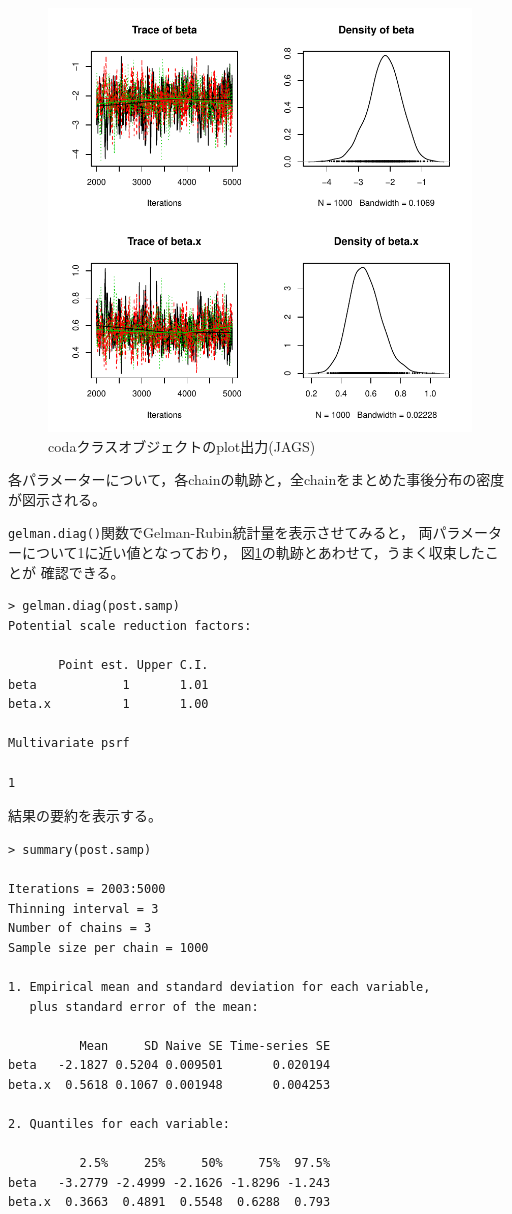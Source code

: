 \documentclass[11pt,uplatex]{jsarticle}
\begin{document}
\begin{figure}[htbp]
	\begin{center}
		\includegraphics[bb=0 0 400 400, clip, width=300 bp]{example2_jags_results.pdf}
	\end{center}
	\caption{\textsf{coda}クラスオブジェクトのplot出力(JAGS)}
	\label{plot_coda}
\end{figure}
\noindent
各パラメーターについて，各chainの軌跡と，全chainをまとめた事後分布の密度が図示される。

\texttt{gelman.diag()}関数でGelman-Rubin統計量を表示させてみると，
両パラメーターについて1に近い値となっており，
図\ref{plot_coda}の軌跡とあわせて，うまく収束したことが
確認できる。
\begin{lstlisting}
> gelman.diag(post.samp)
Potential scale reduction factors:

       Point est. Upper C.I.
beta            1       1.01
beta.x          1       1.00

Multivariate psrf

1
\end{lstlisting}

\vspace{2zw}

結果の要約を表示する。
\begin{lstlisting}
> summary(post.samp)

Iterations = 2003:5000
Thinning interval = 3 
Number of chains = 3 
Sample size per chain = 1000 

1. Empirical mean and standard deviation for each variable,
   plus standard error of the mean:

          Mean     SD Naive SE Time-series SE
beta   -2.1827 0.5204 0.009501       0.020194
beta.x  0.5618 0.1067 0.001948       0.004253

2. Quantiles for each variable:

          2.5%     25%     50%     75%  97.5%
beta   -3.2779 -2.4999 -2.1626 -1.8296 -1.243
beta.x  0.3663  0.4891  0.5548  0.6288  0.793

\end{lstlisting}
\end{document}

